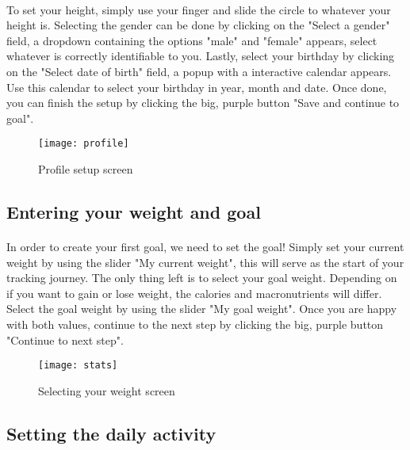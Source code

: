 \documentclass{article}
\begin{document}
\paragraph{}
    To set your height, simply use your finger and slide the circle to whatever your height is. Selecting the gender can be done by clicking on the "Select a gender" field,
    a dropdown containing the options "male" and "female" appears, select whatever is correctly identifiable to you. Lastly, select your birthday by clicking on the "Select date of birth"
    field, a popup with a interactive calendar appears. Use this calendar to select your birthday in year, month and date. Once done, you can finish the setup by clicking the big, purple
    button "Save and continue to goal".

    \hfill \break
    \hfill \break

    \begin{figure}[h!]
        \texttt{[image: profile]}
        \centering
        \caption{Profile setup screen}
    \end{figure}
    \newpage

\subsection{Entering your weight and goal}
\paragraph{}
    In order to create your first goal, we need to set the goal! Simply set your current weight by using the slider "My current weight", this will serve as the start
    of your tracking journey. The only thing left is to select your goal weight. Depending on if you want to gain or lose weight, the calories and macronutrients will differ.
    Select the goal weight by using the slider "My goal weight". Once you are happy with both values, continue to the next step by clicking the big, purple
    button "Continue to next step".

    \hfill \break
    \hfill \break

    \begin{figure}[h!]
        \texttt{[image: stats]}
        \centering
        \caption{Selecting your weight screen}
    \end{figure}
    \newpage

\subsection{Setting the daily activity}
\end{document}
